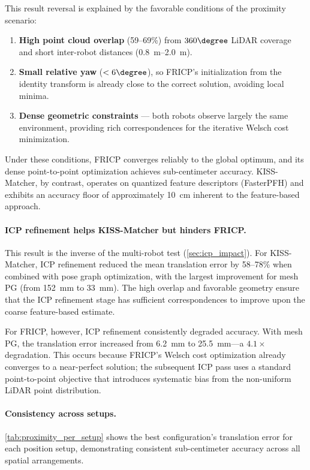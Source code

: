 This result reversal is explained by the favorable conditions
of the proximity scenario:
\begin{enumerate}
    \item \textbf{High point cloud overlap} (59--69\%) from
          $360\degree$ LiDAR coverage and short inter-robot distances
          (\SIrange{0.8}{2.0}{\metre}).
    \item \textbf{Small relative yaw} ($< 6\degree$), so FRICP's
          initialization from the identity transform is already close
          to the correct solution, avoiding local minima.
    \item \textbf{Dense geometric constraints} --- both robots observe
          largely the same environment, providing rich correspondences
          for the iterative Welsch cost minimization.
\end{enumerate}
Under these conditions, FRICP converges reliably to the global
optimum, and its dense point-to-point optimization achieves
sub-centimeter accuracy.
KISS-Matcher, by contrast, operates on quantized feature
descriptors (FasterPFH) and exhibits an accuracy floor of
approximately \SI{10}{\centi\metre} inherent to the feature-based
approach.

\paragraph{ICP refinement helps KISS-Matcher but hinders FRICP.}
This result is the inverse of the multi-robot test
(\autoref{sec:icp_impact}).
For KISS-Matcher, ICP refinement reduced the mean translation error
by 58--78\% when combined with pose graph optimization, with the
largest improvement for mesh PG (from \SI{152}{\milli\metre} to
\SI{33}{\milli\metre}).
The high overlap and favorable geometry ensure that the ICP
refinement stage has sufficient correspondences to improve upon
the coarse feature-based estimate.

For FRICP, however, ICP refinement consistently degraded accuracy.
With mesh PG, the translation error increased from
\SI{6.2}{\milli\metre} to \SI{25.5}{\milli\metre}---a $4.1\times$
degradation.
This occurs because FRICP's Welsch cost optimization already
converges to a near-perfect solution; the subsequent ICP pass
uses a standard point-to-point objective that introduces
systematic bias from the non-uniform LiDAR point distribution.

\paragraph{Consistency across setups.}
\autoref{tab:proximity_per_setup} shows the best configuration's
translation error for each position setup, demonstrating
consistent sub-centimeter accuracy across all spatial arrangements.


